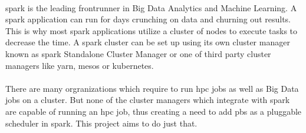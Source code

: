\paragraph{}
\Gls{spark} is the leading frontrunner in Big Data Analytics and Machine
Learning. A \gls{spark} application can run for days crunching on data and
churning out results. This is why most \gls{spark} applications utilize a
cluster of nodes to execute tasks to decrease the time. A \gls{spark} cluster
can be set up using its own cluster manager known as \gls{spark} Standalone
Cluster Manager or one of third party cluster managers like \gls{yarn},
\gls{mesos} or \gls{kubernetes}.

\paragraph{}
There are many orgranizations which require to run \gls{hpc} jobs as well as
Big Data jobs on a cluster. But none of the cluster managers which integrate
with \gls{spark} are capable of running an \gls{hpc} job, thus creating a need
to add \gls{pbs} as a pluggable scheduler in \gls{spark}. This project aims to
do just that.
